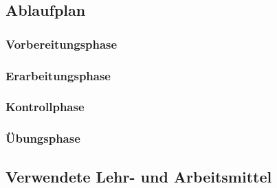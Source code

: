 \subsection{Ablaufplan}
\subsubsection*{Vorbereitungsphase}
\subsubsection*{Erarbeitungsphase}
\subsubsection*{Kontrollphase}
\subsubsection*{Übungsphase}
\subsection{Verwendete Lehr- und Arbeitsmittel}
